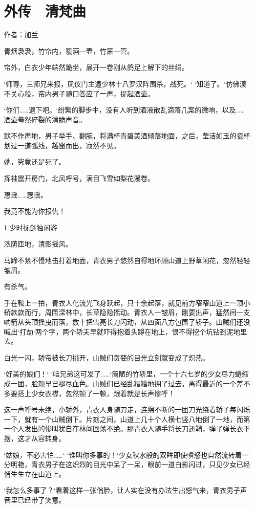 \part{外传　清梵曲}

作者：加兰

青烟袅袅，竹帘内，暖酒一壶，竹箫一管。

帘外，白衣少年端然跪坐，展开一卷刚从鸽足上解下的丝绢。

‘师尊，三师兄来报，凤仪门主遭少林十八罗汉阵围杀，战死。‘ ‘知道了。‘仿佛漠不关心般，帘内男子随口答应了一声，提起酒壶。

‘你们……退下吧。‘纷繁的脚步中，没有人听到酒液散乱滴落几案的微响，以及……酒壶蓦然碎裂的清脆声音。

默不作声地，男子举手、翻腕，将满杯青碧美酒倾落地面，之后，莹洁如玉的瓷杯划过一道弧线，越窗而出，寂然不见。

她，究竟还是死了。

挥袖震开房门，北风呼号，满目飞雪如梨花漫卷。

惠瑶……惠瑶。

我竟不能为你报仇！

1.少时抚剑独闲游

浓荫匝地，清影摇风。

马蹄不紧不慢地击打着地面，青衣男子悠然自得地环顾山道上野草闲花，忽然轻轻皱眉。

有杀气。

手在鞍上一拍，青衣人化流光飞身跃起，只十余起落，就见前方窄窄山道上一顶小轿款款而行，周围深林中，长草隐隐摇动。青衣人一皱眉，刚要出声，猛然间一支响箭从头顶摇曳而落，数十把雪亮长刀闪动，从四面八方包围了轿子。山贼们还没喊出‘打劫‘两个字，两个轿夫早就吓得抱着头蹲在地上，恨不得挖个坑钻到泥地里去。

白光一闪，轿帘被长刀挑开，山贼们贪婪的目光立刻就变成了炽热。

‘好美的娘们！‘ ‘咱兄弟这可发了……‘简陋的竹轿里，一个十六七岁的少女尽力蜷缩成一团，脸颊早已褪尽血色。山贼们已经乱糟糟地拥了过去，离得最近的一个差不多要搭上少女衣襟，忽然顿了一顿，跟着就是长声惨呼！

这一声呼号未绝，小轿外，青衣人身随刀走，连绵不断的一团刀光绕着轿子每闪烁一下，就有一个山贼倒下。片刻之间，山道上几十个人横七竖八地倒了一地，而第一个人发出的惨叫犹自在林间回荡不绝。那青衣人随手将长刀还鞘，弹了弹长衣下摆，这才从容转身。

‘姑娘，不必害怕……‘ ‘谁叫你多事的！‘少女秋水般的双眸即使嗔怒也自然流转着一分明艳，青衣男子在这炽烈的目光中呆了一呆，眼前一道白影闪过，只见少女已经俏生生立在山道上。

‘我怎么多事了？‘看着这样一张俏脸，让人实在没有办法生出怒气来，青衣男子声音里已经带了笑意。

